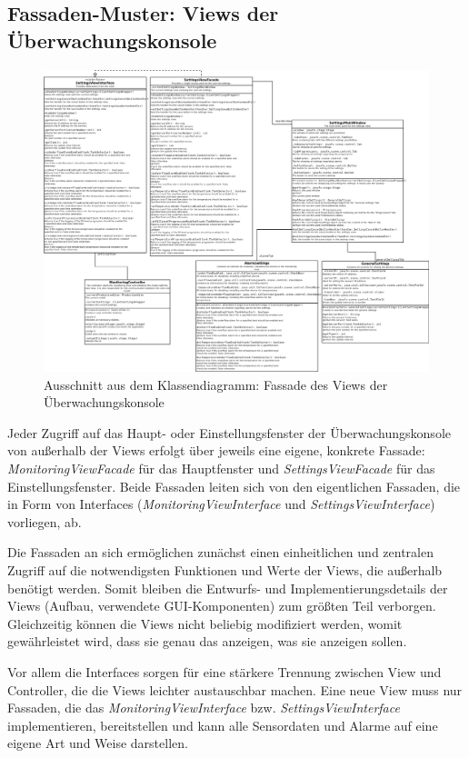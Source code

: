 \documentclass[parskip=full]{scrartcl}
\begin{document}
\pagebreak
\subsection{Fassaden-Muster: Views der Überwachungskonsole}
\begin{figure}[H]
  \centering
  \includegraphics[scale=0.22]{design/pattern-screenshots/fascade-SettingsView.png}
  \caption{Ausschnitt aus dem Klassendiagramm: Fassade des Views der Überwachungskonsole}
\end{figure}
Jeder Zugriff auf das Haupt- oder Einstellungsfenster der Überwachungskonsole von außerhalb der Views erfolgt über jeweils eine eigene, konkrete Fassade:
\emph{MonitoringViewFacade} für das Hauptfenster und \emph{SettingsViewFacade} für das Einstellungsfenster. Beide Fassaden leiten sich von den eigentlichen Fassaden, die in Form
von Interfaces (\emph{MonitoringViewInterface} und \emph{SettingsViewInterface}) vorliegen, ab.

Die Fassaden an sich ermöglichen zunächst einen einheitlichen und zentralen Zugriff auf die notwendigsten Funktionen und Werte der Views, die außerhalb benötigt werden. Somit
bleiben die Entwurfs- und Implementierungsdetails der Views (Aufbau, verwendete GUI-Komponenten) zum größten Teil verborgen. Gleichzeitig können die Views nicht beliebig
modifiziert werden, womit gewährleistet wird, dass sie genau das anzeigen, was sie anzeigen sollen.

Vor allem die Interfaces sorgen für eine stärkere Trennung zwischen View und Controller, die die Views leichter austauschbar machen. Eine neue View muss nur Fassaden, die das
\emph{MonitoringViewInterface} bzw. \emph{SettingsViewInterface} implementieren, bereitstellen und kann alle Sensordaten und Alarme auf eine eigene Art und Weise darstellen.
\end{document}
